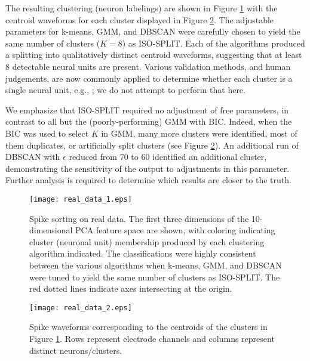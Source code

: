 \documentclass[10pt]{article}
\begin{document}
The resulting clustering (neuron labelings) are shown in Figure \ref{fig:real_data_1} with the centroid waveforms for each cluster displayed in Figure \ref{fig:real_data_2}. The adjustable parameters for k-means, GMM, and DBSCAN were carefully chosen to yield the same number of clusters ($K=8$) as ISO-SPLIT. Each of the algorithms produced a splitting into qualitatively distinct centroid waveforms, suggesting that at least 8 detectable neural units are present. Various validation methods, and human judgements, are now commonly applied to determine whether each cluster is a single neural unit, e.g., \cite{Hill2011}; we do not attempt to perform that here.

We emphasize that ISO-SPLIT required no adjustment of free parameters, in contrast to all but the (poorly-performing) GMM with BIC. Indeed, when the BIC was used to select $K$ in GMM, many more clusters were identified, most of them duplicates, or artificially split clusters (see Figure \ref{fig:real_data_2}). An additional run of DBSCAN with $\epsilon$ reduced from $70$ to $60$ identified an additional cluster, demonstrating the sensitivity of the output to adjustments in this parameter. Further analysis is required to determine which results are closer to the truth.

\begin{figure}
\begin{center}
\texttt{[image: real\_data\_1.eps]}
\end{center}
\caption{
  Spike sorting on real data. The first three dimensions of the 10-dimensional PCA feature space are shown, with coloring indicating cluster (neuronal unit) membership produced by each clustering algorithm indicated. The classifications were highly consistent between the various algorithms when k-means, GMM, and DBSCAN were tuned to yield the same number of clusters as ISO-SPLIT.
  The red dotted lines indicate axes intersecting at the origin.
}
\label{fig:real_data_1}
\end{figure}

\begin{figure}
\begin{center}
\texttt{[image: real\_data\_2.eps]}
\end{center}
\caption{
Spike waveforms corresponding to the centroids of the clusters in Figure \ref{fig:real_data_1}. Rows represent electrode channels and columns represent distinct neurons/clusters.
}
\label{fig:real_data_2}
\end{figure}
\end{document}
